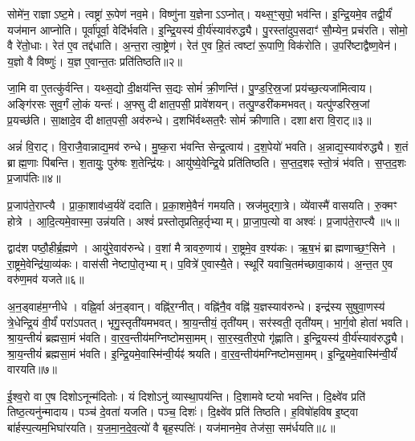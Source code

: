सोमे॑न॒ राज्ञा\-ऽष्ट॒मे।
त्वष्ट्रा॑ रू॒पेण॑ नव॒मे।
विष्णु॑ना य॒ज्ञेनाऽऽप्नोत्।
यथ्स॒ꣳ॒सृपो॒ भव॑न्ति।
इ॒न्द्रि॒यमे॒व तद्वी॒र्यं॑ यज॑मान आप्नोति।
पूर्वा॑पूर्वा॒ वेदि॑र्भवति।
इ॒न्द्रि॒यस्य॑ वी॒र्य॑स्याव॑रुद्ध्यै।
पु॒रस्ता॑दुप॒सदाꣳ॑ सौ॒म्येन॒ प्रच॑रति।
सोमो॒ वै रे॑तो॒धाः।
रेत॑ ए॒व तद्द॑धाति।
अ॒न्त॒रा त्वा॒ष्ट्रेण॑।
रेत॑ ए॒व हि॒तं त्वष्टा॑ रू॒पाणि॒ विक॑रोति।
उ॒परि॑ष्टाद्वैष्ण॒वेन॑।
य॒ज्ञो वै विष्णुः॑।
य॒ज्ञ ए॒वान्त॒तः प्रति॑तिष्ठति॥२॥\anuvakamend[स॒प्त॒मे द॑धाति॒ पञ्च॑ च]

जा॒मि वा ए॒तत्कु॑र्वन्ति।
यथ्स॒द्यो दी॒क्षय॑न्ति स॒द्यः सोमं॑ क्री॒णन्ति॑।
पु॒ण्ड॒रि॒स्र॒जां प्रय॑च्छ॒त्यजा॑मित्वाय।
अङ्गि॑रसः सुव॒र्गं लो॒कं यन्तः॑।
अ॒फ्सु दीक्षात॒पसी॒ प्रावे॑शयन्।
तत्पु॒ण्डरी॑कमभवत्।
यत्पु॑ण्डरिस्र॒जां प्र॒यच्छ॑ति।
सा॒क्षादे॒व दीक्षात॒पसी॒ अव॑रुन्धे।
द॒शभि॑र्वथ्सत॒रैः सोमं॑ क्रीणाति।
दशाक्षरा वि॒राट्॥३॥

अन्नं॑ वि॒राट्।
वि॒राजै॒वान्नाद्य॒मव॑ रुन्धे।
मु॒ष्क॒रा भ॑वन्ति सेन्द्र॒त्वाय॑।
द॒श॒पेयो॑ भवति।
अ॒न्नाद्य॒स्याव॑रुद्ध्यै।
श॒तं ब्राह्म॒णाः पि॑बन्ति।
श॒तायुः॒ पुरु॑षः श॒तेन्द्रि॑यः।
आयु॑ष्ये॒वेन्द्रि॒ये प्रति॑तिष्ठति।
स॒प्त॒द॒शꣴ स्तो॒त्रं भ॑वति।
स॒प्त॒द॒शः प्र॒जाप॑तिः॥४॥

प्र॒जाप॑ते॒राप्त्यै।
प्रा॒का॒शाव॑ध्व॒र्यवे॑ ददाति।
प्र॒का॒शमे॒वैनं॑ गमयति।
स्रज॑मुद्गा॒त्रे।
व्ये॑वास्मै॑ वासयति।
रु॒क्मꣳ होत्रे।
आ॒दि॒त्यमे॒वास्मा॒ उन्न॑यति।
अश्वं॑ प्रस्तोतृप्रतिह॒र्तृभ्याम्।
प्रा॒जा॒प॒त्यो वा अश्वः॑।
प्र॒जाप॑ते॒राप्त्यै॥५॥

द्वाद॑श पष्ठौ॒हीर्ब्र॒ह्मणे।
आयु॑रे॒वाव॑रुन्धे।
व॒शां मैत्रावरु॒णाय॑।
रा॒ष्ट्रमे॒व व॒श्य॑कः।
ऋ॒ष॒भं ब्राह्मणाच्छ॒ꣳ॒सिने।
रा॒ष्ट्रमे॒वेन्द्रि॑या॒\-व्य॑कः।
वास॑सी नेष्टापो॒तृभ्याम्।
प॒वित्रे॑ ए॒वास्यै॒ते।
स्थूरि॑ यवाचि॒तम॑च्छावा॒काय॑।
अ॒न्त॒त ए॒व वरु॑ण॒मव॑ यजते॥६॥

अ॒न॒ड्वाह॑म॒ग्नीधे।
वह्नि॒र्वा अ॑न॒ड्वान्।
वह्नि॑र॒ग्नीत्।
वह्नि॑नै॒व वह्नि॑ य॒ज्ञस्याव॑रुन्धे।
इन्द्र॑स्य सुषुवा॒णस्य॑ त्रे॒धेन्द्रि॒यं वी॒र्यं॑ परा॑\-ऽपतत्।
भृगु॒स्तृती॑यमभवत्।
श्रा॒य॒न्तीयं॒ तृती॑यम्।
सर॑स्वती॒ तृती॑यम्।
भा॒र्ग॒वो होता॑ भवति।
श्रा॒य॒न्तीयं॑ ब्रह्मसा॒मं भ॑वति।
वा॒र॒व॒न्तीय॑मग्निष्टोमसा॒मम्।
सा॒र॒स्व॒तीर॒पो गृ॑ह्णाति।
इ॒न्द्रि॒यस्य॑ वी॒र्य॑स्याव॑रुद्ध्यै।
श्रा॒य॒न्तीयं॑ ब्रह्मसा॒मं भ॑वति।
इ॒न्द्रि॒यमे॒वास्मि॑न्वी॒र्यꣴ॑ श्रयति।
वा॒र॒व॒न्तीय॑मग्निष्टोमसा॒मम्।
इ॒न्द्रि॒यमे॒वास्मि॑न्वी॒र्यं॑ वारयति॥७॥\anuvakamend[वि॒राट्प्र॒जाप॑ति॒रश्वः॑ प्र॒जाप॑ते॒राप्त्यै॑ यजते ब्रह्मसा॒मं भ॑वति स॒प्त च॑]

ई॒श्व॒रो वा ए॒ष दिशो\-ऽनून्म॑दितोः।
यं दिशोऽनु॑ व्यास्था॒पय॑न्ति।
दि॒शामवेष्टयो भवन्ति।
दि॒क्ष्वे॑व प्रति॑ तिष्ठ॒त्यनु॑न्मादाय।
पञ्च॑ दे॒वता॑ यजति।
पञ्च॒ दिशः॑।
दि॒क्ष्वे॑व प्रति॑ तिष्ठति।
ह॒विषो॑हविष इ॒ष्ट्वा बा॑र्\mbox{}हस्प॒त्यम॒भिघा॑रयति।
य॒ज॒मा॒न॒दे॒व॒त्यो॑ वै बृह॒स्पतिः॑।
यज॑मानमे॒व तेज॑सा॒ सम॑र्धयति॥८॥

